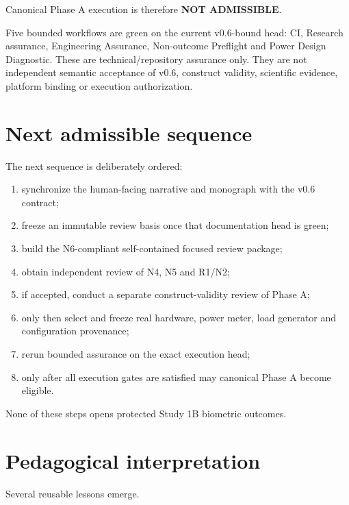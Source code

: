 \documentclass[10pt,a4paper]{article}
\begin{document}
Canonical Phase A execution is therefore \textbf{NOT ADMISSIBLE}.

Five bounded workflows are green on the current v0.6-bound head: CI, Research assurance, Engineering Assurance,
Non-outcome Preflight and Power Design Diagnostic. These are technical/repository assurance only. They are not
independent semantic acceptance of v0.6, construct validity, scientific evidence, platform binding or execution
authorization.

\section{Next admissible sequence}

The next sequence is deliberately ordered:

\begin{enumerate}
\item synchronize the human-facing narrative and monograph with the v0.6 contract;
\item freeze an immutable review basis once that documentation head is green;
\item build the N6-compliant self-contained focused review package;
\item obtain independent review of N4, N5 and R1/N2;
\item if accepted, conduct a separate construct-validity review of Phase A;
\item only then select and freeze real hardware, power meter, load generator and configuration provenance;
\item rerun bounded assurance on the exact execution head;
\item only after all execution gates are satisfied may canonical Phase A become eligible.
\end{enumerate}

None of these steps opens protected Study 1B biometric outcomes.

\section{Pedagogical interpretation}

Several reusable lessons emerge.
\end{document}
